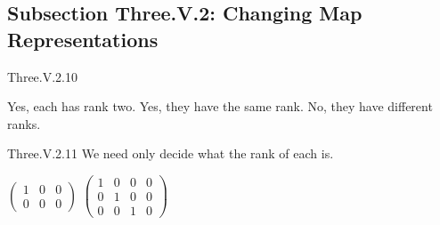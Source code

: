 \subsection{Subsection Three.V.2: Changing Map Representations}
\begin{ans}{Three.V.2.10}
      \begin{exparts}
        \partsitem Yes, each has rank two.
        \partsitem Yes, they have the same rank.
        \partsitem No, they have different ranks.
      \end{exparts}
    
\end{ans}
\begin{ans}{Three.V.2.11}
      We need only decide what the rank of each is.
      \begin{exparts*}
        \partsitem \( \begin{pmatrix}
                   1  &0  &0  \\
                   0  &0  &0
                 \end{pmatrix} \)
        \partsitem \( \begin{pmatrix}
                   1  &0  &0  &0  \\
                   0  &1  &0  &0  \\
                   0  &0  &1  &0
                 \end{pmatrix} \)
      \end{exparts*}
    
\end{ans}

